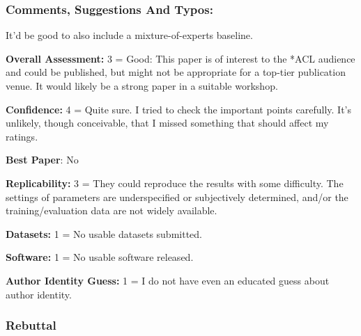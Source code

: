 \documentclass[12pt,times,a4paper,twoside]{article}
\theoremstyle{definition}
\begin{document}
\subsubsection*{Comments, Suggestions And Typos:}
It'd be good to also include a mixture-of-experts baseline.

\textbf{Overall Assessment:} 3 = Good: This paper is of interest to the *ACL audience and could be published, but might not be appropriate for a top-tier publication venue. It would likely be a strong paper in a suitable workshop.

\textbf{Confidence:} 4 = Quite sure. I tried to check the important points carefully. It's unlikely, though conceivable, that I missed something that should affect my ratings.

\textbf{Best Paper}: No

\textbf{Replicability:} 3 = They could reproduce the results with some difficulty. The settings of parameters are underspecified or subjectively determined, and/or the training/evaluation data are not widely available.

\textbf{Datasets:} 1 = No usable datasets submitted.

\textbf{Software:} 1 = No usable software released.

\textbf{Author Identity Guess:} 1 = I do not have even an educated guess about author identity.

\subsubsection*{Rebuttal}
\end{document}
